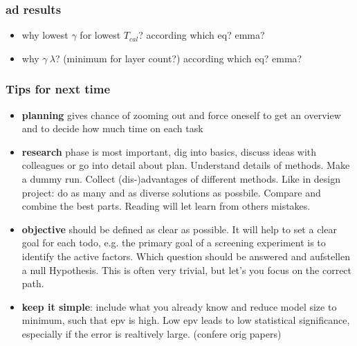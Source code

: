 %
\subsubsection{ad results}
\begin{itemize}
    \item why lowest $\gamma$ for lowest $T_{cal}$? according which eq? emma? 
    \item why $\gamma ~ \lambda$? (minimum for layer count?) according which eq? emma? 
\end{itemize}
%
\subsubsection{Tips for next time}
\begin{itemize}
    \item \textbf{planning} gives chance of zooming out and force oneself to get an overview and to decide how much time on each task
    \item \textbf{research} phase is most important, dig into basics, discuss ideas with colleagues or go into detail about plan. Understand details of methods. Make a dummy run. Collect (dis-)advantages of different methods. Like in design project: do as many and as diverse solutions as possbile. Compare and combine the best parts. Reading will let learn from others mistakes. \\ 
    \item \textbf{objective} should be defined as clear as possible. It will help to set a clear goal for each todo, e.g. the primary goal of a screening experiment is to identify the active factors.\cite{miller2001using} Which question should be answered and aufstellen a null Hypothesis. This is often very trivial, but let's you focus on the correct path. 
    \item \textbf{keep it simple}: include what you already know and reduce model size to minimum, such that \gls{epv} is high.  Low \gls{epv} leads to low statistical significance, especially if the error is realtively large. (confere orig papers)

\end{itemize}

